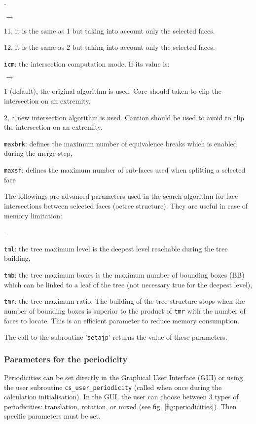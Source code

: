 {{{\begin{list}{-}{}
\begin{list}{$\rightarrow$}{}
\item 11, it is the same as 1 but taking into account only the selected faces.
\item 12, it is the same as 2 but taking into account only the selected faces.
\end{list}
\item \texttt{icm}: the intersection computation mode. If its value is:
\begin{list}{$\rightarrow$}{}
\item 1 (default), the original algorithm is used. Care should taken to clip the intersection on an extremity.
\item 2, a new intersection algorithm is used. Caution should be used to avoid to clip the intersection on an extremity.
\end{list}
\item \texttt{maxbrk}: defines the maximum number of equivalence breaks which is enabled during the merge step,
\item \texttt{maxsf}: defines the maximum number of sub-faces used when splitting a selected face
\end{list}
%
The followings are advanced parameters used in the search algorithm for face intersections between selected faces (octree structure). They are useful in case of memory limitation:
\begin{list}{-}{}
\item \texttt{tml}: the tree maximum level is the deepest level reachable during the tree building,
\item \texttt{tmb}: the tree maximum boxes is the maximum number of bounding boxes (BB) which can be linked to a leaf of the tree (not necessary true for the deepest level),
\item \texttt{tmr}: the tree maximum ratio. The building of the tree structure stops when the number of bounding boxes is superior to the product of \texttt{tmr} with the number of faces to locate. This is an efficient parameter to reduce memory consumption.
\end{list}
The call to the subroutine '\texttt{setajp}' returns the value of these parameters.

\subsubsection{Parameters for the periodicity}

Periodicities can be set directly in the Graphical User Interface (GUI) or using the user subroutine \texttt{cs\_user\_periodicity} (called when once during the calculation initialisation). In the GUI, the user can choose between 3 types of periodicities: translation, rotation, or mixed (see fig. \ref{fig:periodicities}).
Then specific parameters must be set.

}}}
